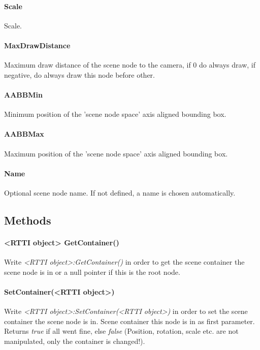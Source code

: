 \paragraph{Scale}
Scale.

\paragraph{MaxDrawDistance}
Maximum draw distance of the scene node to the camera, if 0 do always draw, if negative, do always draw this node before other.

\paragraph{AABBMin}
Minimum position of the 'scene node space' axis aligned bounding box.

\paragraph{AABBMax}
Maximum position of the 'scene node space' axis aligned bounding box.

\paragraph{Name}
Optional scene node name. If not defined, a name is chosen automatically.


\subsection{Methods}

\paragraph{<RTTI object> GetContainer()}
Write \emph{<RTTI object>:GetContainer()} in order to get the scene container the scene node is in or a null pointer if this is the root node.

\paragraph{SetContainer(<RTTI object>)}
Write \emph{<RTTI object>:SetContainer(<RTTI object>)} in order to set the scene container the scene node is in. Scene container this node is in as first parameter. Returns \emph{true} if all went fine, else \emph{false} (Position, rotation, scale etc. are not manipulated, only the container is changed!).

